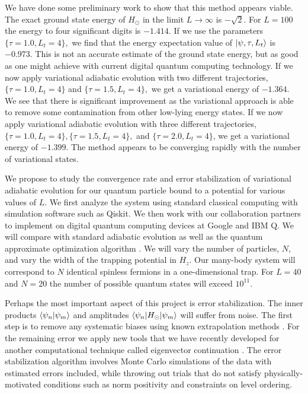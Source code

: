 \documentclass[aps,longbibliography,final,prl,onecolumn,superscriptaddress,nofootinbib,floatfix,11pt]{revtex4-1}
\begin{document}
We have done some preliminary work to show that this method appears viable. The exact ground state energy of $H_\odot$ in the limit $L \rightarrow \infty$ is $-\sqrt{2}$.  For $L = 100$ the energy to four significant digits is $-1.414$. If we use the parameters $\{\tau = 1.0,L_t = 4\},$ we find that the energy expectation value of $\ket{\psi,\tau,L_t}$ is $-0.973$.  This is not an accurate estimate of the ground state energy, but as good as one might achieve with current digital quantum computing technology.  If we now apply variational adiabatic evolution with two different trajectories, $\{\tau = 1.0,L_t = 4\}$ and $\{\tau = 1.5,L_t = 4\},$ we get a variational energy of $-1.364$.  We see that there is significant improvement as the variational approach is able to remove some contamination from other low-lying energy states. If we now apply variational adiabatic evolution with three different trajectories, $\{\tau = 1.0,L_t = 4\}, \{\tau = 1.5,L_t = 4\},$ and $\{\tau = 2.0,L_t = 4\}$, we get a variational energy of $-1.399$.  The method appears to be converging rapidly with the number of variational states.   

We propose to study the convergence rate and error stabilization of variational adiabatic evolution for our quantum particle bound to a potential for various values of $L$.  We first analyze the system using standard classical computing with simulation software such as Qiskit.  We then work with our collaboration partners to implement on digital quantum computing devices  at Google and IBM Q.  We will compare with standard adiabatic evolution as well as the quantum approximate optimization algorithm \cite{Farhi:2014}. We will vary the number of particles, $N$, and vary the width of the trapping potential in $H_z$.  Our many-body system will correspond to $N$ identical spinless fermions in a one-dimensional trap.  For $L = 40$ and $N = 20$ the number of possible quantum states will exceed $10^{11}$.

Perhaps the most important aspect of this project is error stabilization.  The inner products $\braket{\psi_n|\psi_m}$ and amplitudes $\braket{\psi_n|H_\odot|\psi_m}$ will suffer from noise.  The first step is to remove any systematic biases using known extrapolation methods \cite{Kandala:2019}. For the remaining error we apply new tools that we have recently developed for another computational technique called eigenvector continuation \cite{Frame:2017fah}.  The error stabilization algorithm involves Monte Carlo simulations of the data with estimated errors included, while throwing out trials that do not satisfy physically-motivated conditions such as norm positivity and constraints on level ordering. 
    
\end{document}
